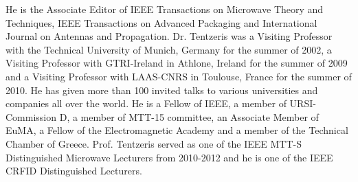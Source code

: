 \documentclass[journal]{IEEEtran}
\begin{document}
\begin{IEEEbiography}
He is the Associate Editor of IEEE Transactions on Microwave Theory and Techniques, IEEE Transactions on Advanced Packaging and International Journal on Antennas and Propagation. 
Dr. Tentzeris was a Visiting Professor with the Technical University of Munich, Germany for the summer of 2002, a Visiting Professor with GTRI-Ireland in Athlone, Ireland for the summer of 2009 and a Visiting Professor with LAAS-CNRS in Toulouse, France for the summer of 2010. He has given more than 100 invited talks to various universities and companies all over the world. He is a Fellow of IEEE, a member of URSI-Commission D, a member of MTT-15 committee, an Associate Member of EuMA, a Fellow of the Electromagnetic Academy and a member of the Technical Chamber of Greece. Prof. Tentzeris served as one of the IEEE MTT-S Distinguished Microwave Lecturers from 2010-2012 and he is one of the IEEE CRFID Distinguished Lecturers.
\end{IEEEbiography}

\end{document}
